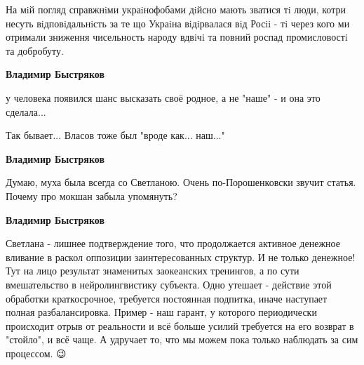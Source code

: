 \begin{itemize}
\begin{itemize}
На мiй погляд справжнiми украiнофобами дiйсно мають зватися тi люди, котри несуть вiдповiдальнiсть за те що Украiна вiдiрвалася вiд Росii - тi через кого ми отримали зниження чисельность народу вдвiчi та повний роспад промисловостi та добробуту.

 
\textbf{Владимир Быстряков}

у человека появился шанс высказать своё родное, а не "наше" - и она это
сделала...

Так бывает... Власов тоже был "вроде как... наш..."


 
\textbf{Владимир Быстряков} 

Думаю, муха была всегда со Светланою. Очень по-Порошенковски звучит статья.
Почему про мокшан забыла упомянуть?

 

\textbf{Владимир Быстряков} 

Светлана - лишнее подтверждение того, что продолжается активное денежное
вливание в раскол оппозиции заинтересованных структур. И не только денежное!
Тут на лицо результат знаменитых заокеанских тренингов, а по сути вмешательство
в нейролингвистику субъекта. Одно утешает - действие этой обработки
краткосрочное, требуется постоянная подпитка, иначе наступает полная
разбалансировка. Пример - наш гарант, у которого периодически происходит отрыв
от реальности и всё больше усилий требуется на его возврат в "стойло", и всё
чаще. А удручает то, что мы можем пока только наблюдать за сим процессом. 😉


 


\end{itemize}
\end{itemize}
